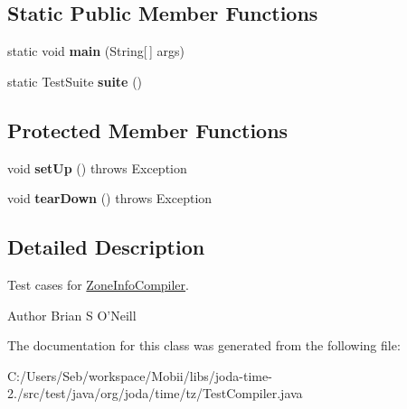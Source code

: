 \subsection*{Static Public Member Functions}
\begin{DoxyCompactItemize}
\item 
\hypertarget{classorg_1_1joda_1_1time_1_1tz_1_1_test_compiler_adab30d03918ff7261add5a49688a638a}{static void {\bfseries main} (String\mbox{[}$\,$\mbox{]} args)}\label{classorg_1_1joda_1_1time_1_1tz_1_1_test_compiler_adab30d03918ff7261add5a49688a638a}

\item 
\hypertarget{classorg_1_1joda_1_1time_1_1tz_1_1_test_compiler_af9417fd6d28869a02997aa52d3ba3b98}{static Test\-Suite {\bfseries suite} ()}\label{classorg_1_1joda_1_1time_1_1tz_1_1_test_compiler_af9417fd6d28869a02997aa52d3ba3b98}

\end{DoxyCompactItemize}
\subsection*{Protected Member Functions}
\begin{DoxyCompactItemize}
\item 
\hypertarget{classorg_1_1joda_1_1time_1_1tz_1_1_test_compiler_a77d5fd301dca5de9fb89406da2106999}{void {\bfseries set\-Up} ()  throws Exception }\label{classorg_1_1joda_1_1time_1_1tz_1_1_test_compiler_a77d5fd301dca5de9fb89406da2106999}

\item 
\hypertarget{classorg_1_1joda_1_1time_1_1tz_1_1_test_compiler_ad6a317db53f765810d1fe06ac2f0c47b}{void {\bfseries tear\-Down} ()  throws Exception }\label{classorg_1_1joda_1_1time_1_1tz_1_1_test_compiler_ad6a317db53f765810d1fe06ac2f0c47b}

\end{DoxyCompactItemize}


\subsection{Detailed Description}
Test cases for \hyperlink{classorg_1_1joda_1_1time_1_1tz_1_1_zone_info_compiler}{Zone\-Info\-Compiler}.

\begin{DoxyAuthor}{Author}
Brian S O'Neill 
\end{DoxyAuthor}


The documentation for this class was generated from the following file\-:\begin{DoxyCompactItemize}
\item 
C\-:/\-Users/\-Seb/workspace/\-Mobii/libs/joda-\/time-\/2./src/test/java/org/joda/time/tz/Test\-Compiler.\-java\end{DoxyCompactItemize}
